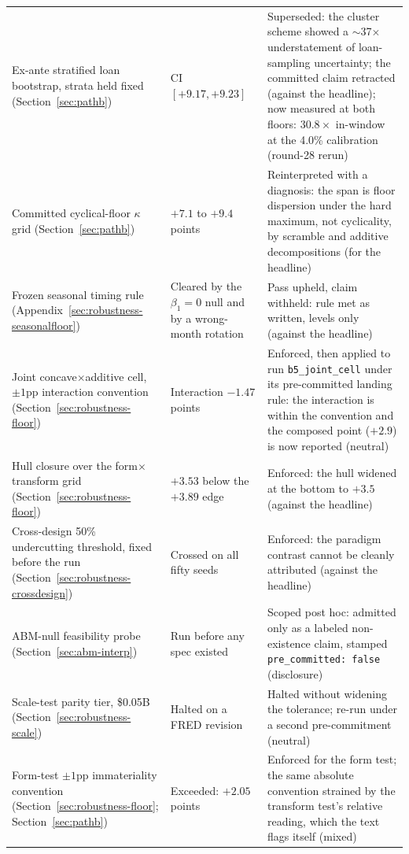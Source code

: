 \documentclass[12pt]{article}
\begin{document}
{\begin{longtable}{@{}p{4.4cm}p{4.2cm}p{5.6cm}@{}}
Ex-ante stratified loan bootstrap, strata held fixed (Section~\ref{sec:pathb}) & CI $[+9.17, +9.23]$ & Superseded: the cluster scheme showed a $\sim$37$\times$ understatement of loan-sampling uncertainty; the committed claim retracted (against the headline); now measured at both floors: $30.8\times$ in-window at the 4.0\% calibration (round-28 rerun)\\
Committed cyclical-floor $\kappa$ grid (Section~\ref{sec:pathb}) & $+7.1$ to $+9.4$ points & Reinterpreted with a diagnosis: the span is floor dispersion under the hard maximum, not cyclicality, by scramble and additive decompositions (for the headline) \\
Frozen seasonal timing rule (Appendix~\ref{sec:robustness-seasonalfloor}) & Cleared by the $\beta_1 = 0$ null and by a wrong-month rotation & Pass upheld, claim withheld: rule met as written, levels only (against the headline) \\
Joint concave$\times$additive cell, $\pm 1$pp interaction convention (Section~\ref{sec:robustness-floor}) & Interaction $-1.47$ points & Enforced, then applied to run \texttt{b5\_joint\_cell} under its pre-committed landing rule: the interaction is within the convention and the composed point ($+2.9$) is now reported (neutral)\\
Hull closure over the form$\times$transform grid (Section~\ref{sec:robustness-floor}) & $+3.53$ below the $+3.89$ edge & Enforced: the hull widened at the bottom to $+3.5$ (against the headline) \\
Cross-design 50\% undercutting threshold, fixed before the run (Section~\ref{sec:robustness-crossdesign}) & Crossed on all fifty seeds & Enforced: the paradigm contrast cannot be cleanly attributed (against the headline) \\
ABM-null feasibility probe (Section~\ref{sec:abm-interp}) & Run before any spec existed & Scoped post hoc: admitted only as a labeled non-existence claim, stamped \texttt{pre\_committed: false} (disclosure) \\
Scale-test parity tier, \$0.05B (Section~\ref{sec:robustness-scale}) & Halted on a FRED revision & Halted without widening the tolerance; re-run under a second pre-commitment (neutral) \\
Form-test $\pm 1$pp immateriality convention (Section~\ref{sec:robustness-floor}; Section~\ref{sec:pathb}) & Exceeded: $+2.05$ points & Enforced for the form test; the same absolute convention strained by the transform test's relative reading, which the text flags itself (mixed) \\

\end{longtable}}
\end{document}
